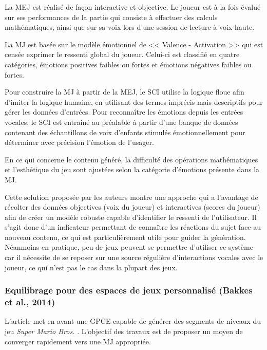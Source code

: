\documentclass[a4paper,11pt]{article}
\begin{document}
        La MEJ est réalisé de façon interactive et objective.
        Le joueur est à la fois évalué sur ses performances de la partie qui consiste à effectuer des calculs mathématiques, ainsi que sur sa voix lors d'une session de lecture à voix haute.

        La MJ est basée sur le modèle émotionnel de << Valence - Activation >> qui est censée exprimer le ressenti global du joueur.
        Celui-ci est classifié en quatre catégories, émotions positives faibles ou fortes et émotions négatives faibles ou fortes.
        
        Pour construire la MJ à partir de la MEJ, le SCI utilise la logique floue afin d'imiter la logique humaine, en utilisant des termes imprécis mais descriptifs pour gérer les données d'entrées. 
        Pour reconnaître les émotions depuis les entrées vocales, le SCI est entrainé au préalable à partir d'une banque de données contenant des échantillons de voix d'enfants stimulés émotionnellement pour déterminer avec précision l'émotion de l'usager.

        En ce qui concerne le contenu généré, la difficulté des opérations mathématiques et l'esthétique du jeu sont ajustées selon la catégorie d'émotions présente dans la MJ.
      
        Cette solution proposée par les auteurs montre une approche qui a l'avantage de récolter des données objectives (voix du joueur) et interactives (scores du joueur) afin de créer un modèle robuste capable d'identifier le ressenti de l'utilisateur.
        Il s'agit donc d'un indicateur permettant de connaître les réactions du sujet face au nouveau contenu, ce qui est particulièrement utile pour guider la génération.
        Néanmoins en pratique, peu de jeux peuvent se permettre d'utiliser ce système car il nécessite de se reposer sur une source régulière d'interactions vocales avec le joueur, ce qui n'est pas le cas dans la plupart des jeux.
        
      \subsubsection{Equilibrage pour des espaces de jeux personnalisé (Bakkes et al., 2014)}

        L'article met en avant une GPCE capable de générer des segments de niveaux du jeu \textit{Super Mario Bros.} \cite{game:Mario}.
        L'objectif des travaux est de proposer un moyen de converger rapidement vers une MJ appropriée.
\end{document}
